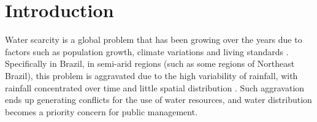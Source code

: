\documentclass{singlecol}
\theoremstyle{TH}{
\newtheorem{lemma}{Lemma}
\newtheorem{theorem}[lemma]{Theorem}
\newtheorem{corrolary}[lemma]{Corrolary}
\newtheorem{conjecture}[lemma]{Conjecture}
\newtheorem{proposition}[lemma]{Proposition}
\newtheorem{claim}[lemma]{Claim}
\newtheorem{stheorem}[lemma]{Wrong Theorem}
\newtheorem{algorithm}{Algorithm}
}
\theoremstyle{THrm}{
\newtheorem{definition}{Definition}[section]
\newtheorem{question}{Question}[section]
\newtheorem{remark}{Remark}
\newtheorem{scheme}{Scheme}
}
\theoremstyle{THhit}{
\newtheorem{case}{Case}[section]
}
\begin{document}

\maketitle


 \section{Introduction}

	Water scarcity is a global problem that has been growing over the years due to factors such as population growth, climate variations and living standards \citep{HangEtAl2021}. Specifically in Brazil, in semi-arid regions (such as some regions of Northeast Brazil), this problem is aggravated due to the high variability of rainfall, with rainfall concentrated over time and little spatial distribution \citep{SilvaEtAl2019}. Such aggravation ends up generating conflicts for the use of water resources, and water distribution becomes a priority concern for public management.
\end{document}
